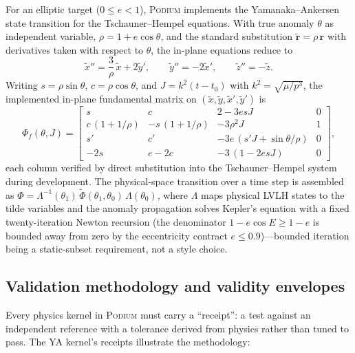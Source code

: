 \documentclass[11pt]{article}
\newcommand{\podium}{\textsc{Podium}}
\begin{document}
For an elliptic target ($0 \le e < 1$), \podium{} implements the
Yamanaka--Ankersen state transition \cite{yamanaka2002} for the
Tschauner--Hempel equations. With true anomaly $\theta$ as independent
variable, $\rho = 1 + e\cos\theta$, and the standard substitution
$\tilde{\mathbf r} = \rho\,\mathbf r$ with derivatives taken with respect to
$\theta$, the in-plane equations reduce to
\begin{equation}
\tilde x'' = \frac{3}{\rho}\,\tilde x + 2\tilde y', \qquad
\tilde y'' = -2\tilde x', \qquad
\tilde z'' = -\tilde z .
\end{equation}
Writing $s=\rho\sin\theta$, $c=\rho\cos\theta$, and
$J = k^2(t-t_0)$ with $k^2 = \sqrt{\mu/p^3}$, the implemented in-plane
fundamental matrix on $(\tilde x,\tilde y,\tilde x',\tilde y')$ is
\begin{equation}
\Phi_f(\theta, J) =
\begin{bmatrix}
s & c & 2-3esJ & 0\\[2pt]
c\,(1{+}1/\rho) & -s\,(1{+}1/\rho) & -3\rho^2 J & 1\\[2pt]
s' & c' & -3e\,(s'J + \sin\theta/\rho) & 0\\[2pt]
-2s & e-2c & -3\,(1-2esJ) & 0
\end{bmatrix},
\label{eq:yafund}
\end{equation}
each column verified by direct substitution into the Tschauner--Hempel
system during development. The physical-space transition over a time step
is assembled as
$\Phi = \Lambda^{-1}(\theta_1)\,\tilde\Phi(\theta_1,\theta_0)\,\Lambda(\theta_0)$,
where $\Lambda$ maps physical LVLH states to the tilde variables and the
anomaly propagation solves Kepler's equation with a fixed twenty-iteration
Newton recursion (the denominator $1-e\cos E \ge 1-e$ is bounded away from
zero by the eccentricity contract $e \le 0.9$)---bounded iteration being a
static-subset requirement, not a style choice.

\subsection{Validation methodology and validity envelopes}
\label{sec:envelopes}

Every physics kernel in \podium{} must carry a ``receipt'': a test against
an independent reference with a tolerance derived from physics rather than
tuned to pass. The YA kernel's receipts illustrate the methodology:
\end{document}

